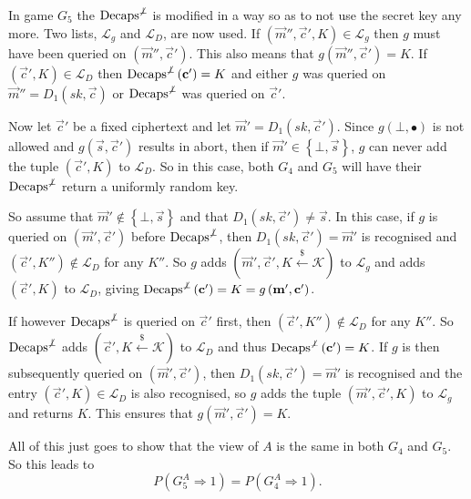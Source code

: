 In game $G_5$ the $\mathrm{Decaps}^{\not\bot}$ is modified in a way so as to not use the secret key any more. Two lists, $\mathcal{L}_g$ and $\mathcal{L}_D$, are now used. If $\left(\vec{m}'', \vec{c}', K\right) \in \mathcal{L}_g$ then $g$ must have been queried on $\left(\vec{m}'', \vec{c}'\right)$. This also means that $g\left(\vec{m}'', \vec{c}'\right) = K$. If $\left(\vec{c}', K\right) \in \mathcal{L}_D$ then $\mathrm{Decaps}^{\not\bot}\left(\vec{c}'\right) = K$ and either $g$ was queried on $\vec{m}'' = D_1\left(sk, \vec{c}\right)$ or $\mathrm{Decaps}^{\not\bot}$ was queried on $\vec{c}'$. 

Now let $\vec{c}'$ be a fixed ciphertext and let $\vec{m}' = D_1\left(sk, \vec{c}'\right)$. Since $g\left(\bot, \bullet\right)$ is not allowed and $g\left(\vec{s}, \vec{c}'\right)$ results in abort, then if $\vec{m}' \in \left\{ \bot,\vec{s} \right\}$, $g$ can never add the tuple $\left(\vec{c}',K\right)$ to $\mathcal{L}_D$. So in this case, both $G_4$ and $G_5$ will have their $\mathrm{Decaps}^{\not\bot}$ return a uniformly random key.

So assume that $\vec{m}' \notin \left\{ \bot,\vec{s} \right\}$ and that $D_1\left(sk, \vec{c}'\right) \neq \vec{s}$. In this case, if $g$ is queried on $\left(\vec{m}', \vec{c}'\right)$ before $\mathrm{Decaps}^{\not\bot}$, then $D_1\left(sk, \vec{c}'\right) = \vec{m}'$ is recognised and $\left(\vec{c}', K''\right) \notin \mathcal{L}_D$ for any $K''$. So $g$ adds $\left(\vec{m}', \vec{c}', K \xleftarrow{\$} \mathcal{K}\right)$ to $\mathcal{L}_g$ and adds $\left(\vec{c}', K\right)$ to $\mathcal{L}_D$, giving $\mathrm{Decaps}^{\not\bot}\left(\vec{c}'\right) = K = g\left(\vec{m}', \vec{c}'\right)$.

If however $\mathrm{Decaps}^{\not\bot}$ is queried on $\vec{c}'$ first, then $\left(\vec{c}',K''\right) \notin \mathcal{L}_D$ for any $K''$. So $\mathrm{Decaps}^{\not\bot}$ adds $\left(\vec{c}', K \xleftarrow{\$} \mathcal{K}\right)$ to $\mathcal{L}_D$ and thus $\mathrm{Decaps}^{\not\bot}\left(\vec{c}'\right) = K$. If $g$ is then subsequently queried on $\left(\vec{m}', \vec{c}'\right)$, then $D_1\left(sk, \vec{c}'\right) = \vec{m}'$ is recognised and the entry $\left(\vec{c}',K\right) \in \mathcal{L}_D$ is also recognised, so $g$ adds the tuple $\left(\vec{m}', \vec{c}', K\right)$ to $\mathcal{L}_g$ and returns $K$. This ensures that $g\left(\vec{m}', \vec{c}'\right) = K$.

All of this just goes to show that the view of $A$ is the same in both $G_4$ and $G_5$. So this leads to
\[
	P\left( G_5^A \Rightarrow 1 \right) = P\left( G_4^A \Rightarrow 1 \right) .
\]


